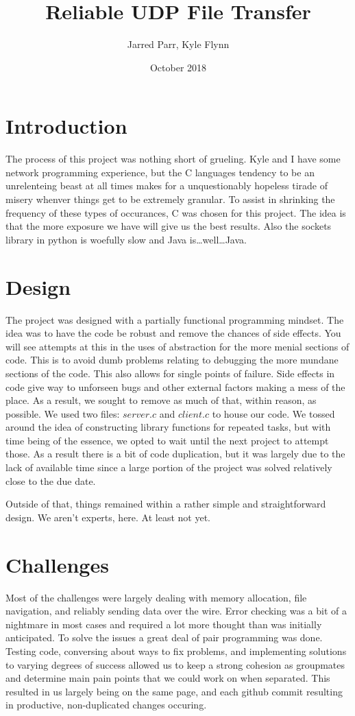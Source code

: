 \documentclass[11pt]{article}
\begin{document}
\title{Reliable UDP File Transfer}
\author{Jarred Parr, Kyle Flynn}

\date{October 2018}
\maketitle

\section{Introduction}
The process of this project was nothing short of grueling. Kyle and I have some network programming experience, but the C languages tendency to be an unrelenteing beast at all times makes for a unquestionably hopeless tirade of misery whenver things get to be extremely granular. To assist in shrinking the frequency of these types of occurances, C was chosen for this project. The idea is that the more exposure we have will give us the best results. Also the sockets library in python is woefully slow and Java is\ldots well\ldots Java.

\section{Design}
The project was designed with a partially functional programming mindset. The idea was to have the code be robust and remove the chances of side effects. You will see attempts at this in the uses of abstraction for the more menial sections of code. This is to avoid dumb problems relating to debugging the more mundane sections of the code. This also allows for single points of failure. Side effects in code give way to unforseen bugs and other external factors making a mess of the place. As a result, we sought to remove as much of that, within reason, as possible. We used two files: $server.c$ and $client.c$ to house our code. We tossed around the idea of constructing library functions for repeated tasks, but with time being of the essence, we opted to wait until the next project to attempt those. As a result there is a bit of code duplication, but it was largely due to the lack of available time since a large portion of the project was solved relatively close to the due date.

Outside of that, things remained within a rather simple and straightforward design. We aren't experts, here. At least not yet.

\section{Challenges}
Most of the challenges were largely dealing with memory allocation, file navigation, and reliably sending data over the wire. Error checking was a bit of a nightmare in most cases and required a lot more thought than was initially anticipated. To solve the issues a great deal of pair programming was done. Testing code, conversing about ways to fix problems, and implementing solutions to varying degrees of success allowed us to keep a strong cohesion as groupmates and determine main pain points that we could work on when separated. This resulted in us largely being on the same page, and each github commit resulting in productive, non-duplicated changes occuring.
\end{document}
